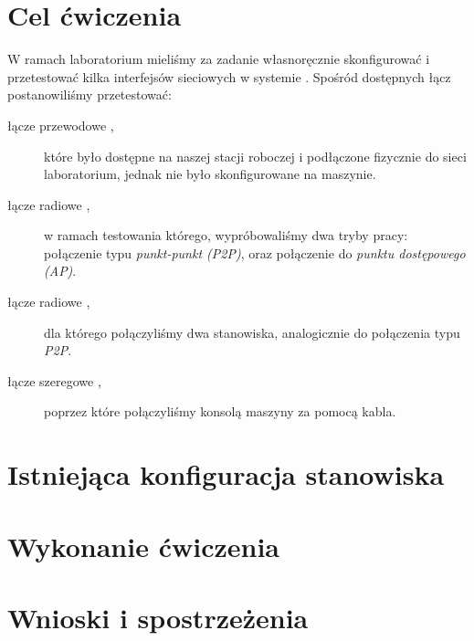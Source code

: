 \documentclass[a4paper,11pt,notitlepage]{article}
\begin{document}

\maketitle
\tableofcontents


\section{Cel ćwiczenia}

W ramach laboratorium mieliśmy za zadanie własnoręcznie skonfigurować i
przetestować kilka interfejsów sieciowych w systemie \bsd. Spośród dostępnych
łącz postanowiliśmy przetestować:

\begin{description}
    \item[łącze przewodowe \eth\textnormal{,}] które było dostępne na naszej stacji roboczej
        i podłączone fizycznie do sieci laboratorium, jednak nie było
        skonfigurowane na maszynie.
    \item[łącze radiowe \wifi\textnormal{,}] w ramach testowania którego, wypróbowaliśmy
        dwa tryby pracy: połączenie typu \emph{punkt-punkt (P2P)}, oraz
        połączenie do \emph{punktu dostępowego (AP)}.
    \item[łącze radiowe \bt\textnormal{,}] dla którego połączyliśmy dwa stanowiska,
        analogicznie do połączenia typu \wifi{} \emph{P2P}.
    \item[łącze szeregowe \uart\textnormal{,}] poprzez które połączyliśmy konsolą maszyny
        \zielone{} za pomocą kabla.
\end{description}


\section{Istniejąca konfiguracja stanowiska}


\section{Wykonanie ćwiczenia}



\section{Wnioski i spostrzeżenia}
\end{document}
